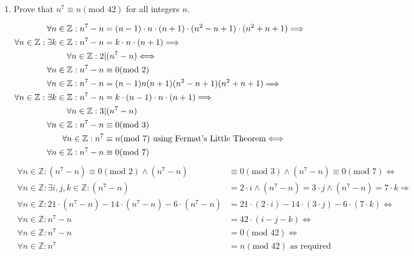 \documentclass[10pt,\jkfside,a4paper]{article}
\begin{document}
\begin{enumerate}
\item Prove that $n^7\equiv n(\text{mod } 42)$ for all integers $n$.
\vspace{-1em}
\begin{center}
\begin{equation}
\begin{split}
\forall n \in \mathbb{Z}: n^7 - n &= (n-1)\cdot n\cdot(n+1)\cdot(n^2-n+1)\cdot(n^2+n+1)\Longrightarrow\\
\forall n \in \mathbb{Z}: \exists k\in\mathbb{Z}: n^7 - n &= k\cdot n\cdot(n+1)\Longrightarrow\\
\forall n \in \mathbb{Z}: 2&|(n^7-n)\Longleftrightarrow\\
\forall n \in \mathbb{Z}: n^7 - n &\equiv 0 (\text{mod } 2)\\
\vspace{1em}
\forall n \in \mathbb{Z}: n^7 - n &= (n-1)n(n+1)(n^2-n+1)(n^2+n+1)\Longrightarrow\\
\forall n \in \mathbb{Z}: \exists k \in \mathbb{Z}: n^7 - n &= k\cdot (n-1) \cdot n \cdot (n + 1)\Longrightarrow\\
\forall n \in \mathbb{Z}: 3&|(n^7-n)\\
\forall n \in \mathbb{Z}: n^7 - n &\equiv 0 (\text{mod } 3)\\
\vspace{1em}
\forall n \in \mathbb{Z}: n^7 &\equiv n (\text{mod } 7) \text{ using Fermat's Little Theorem}\Longleftrightarrow\\
\forall n \in \mathbb{Z}: n^7 - n &\equiv 0(\text{mod } 7)\\
\end{split}
\end{equation}
\vspace{0.5em}
\begin{equation}
\begin{split}
\forall n \in \mathbb{Z}: (n^7 - n) \equiv 0(\text{mod } 2) \wedge (n^7 - n) &\equiv 0(\text{mod } 3) \wedge (n^7-n)\equiv0(\text{mod } 7) \Longleftrightarrow\\
\forall n \in \mathbb{Z}: \exists i, j, k \in \mathbb{Z}: (n^7 - n) &= 2\cdot i \wedge (n^7 - n) = 3\cdot j \wedge (n^7 - n) = 7\cdot k\Longrightarrow\\
\forall n \in \mathbb{Z}: 21\cdot (n^7 - n) - 14\cdot (n^7 - n) - 6\cdot (n^7 - n) &= 21\cdot (2\cdot i) - 14\cdot(3\cdot j) - 6\cdot (7\cdot k) \Longleftrightarrow\\
\forall n \in \mathbb{Z}: n^7 - n &= 42\cdot(i - j - k)\Longleftrightarrow\\
\forall n \in \mathbb{Z}: n^7 - n &= 0 (\text{mod } 42)\Longleftrightarrow\\
\forall n \in \mathbb{Z}: n^7 &= n (\text{mod } 42) \text{ as required}\\
\end{split}
\end{equation}
\end{center}

\end{enumerate}
\end{document}
